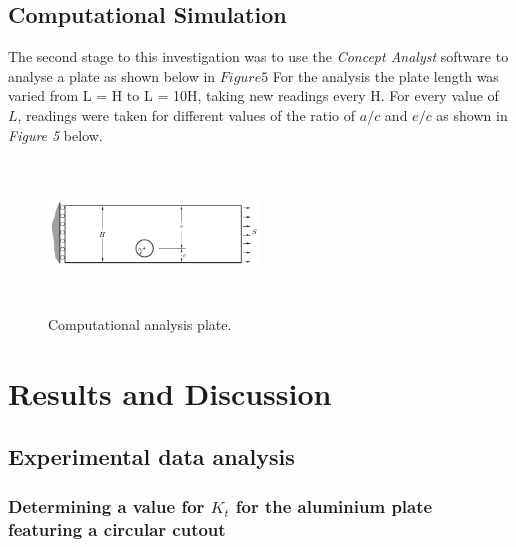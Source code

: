 \documentclass[11pt,twocolumn]{article} %
\begin{document}
\subsection{Computational Simulation}
The second stage to this investigation was to use the \textit{Concept Analyst} software to analyse a plate as shown below in $Figure  5$ For the analysis the plate length was varied from L = H to L = 10H, taking new readings every H. For every value of $L$, readings were taken for different values of the ratio of $a/c$ and $e/c$ as shown in \textit{Figure 5} below.
\begin{figure}[!ht]
\centering
\includegraphics[height=4cm,width=0.5\textwidth]{ComputationalPlate.png}
\caption{Computational analysis plate.}
\end{figure} 

\section{Results and Discussion}

\subsection{Experimental data analysis}

\subsubsection{Determining a value for $K_{t}$ for the aluminium plate featuring a circular cutout} 
\end{document}
